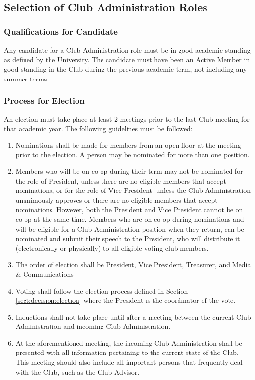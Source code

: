 \documentclass[english,11pt]{article}
\begin{document}
\subsection{Selection of Club Administration Roles} \label{sect:cadmin:selection}

\subsubsection{Qualifications for Candidate} \label{subsect:cadmin:selection:qualifications}
Any candidate for a Club Administration role must be in good academic standing as defined by the University.
The candidate must have been an Active Member in good standing in the Club during the previous academic term, not including any summer terms.

\subsubsection{Process for Election} \label{subsect:cadmin:selection:election}
An election must take place at least 2 meetings prior to the last Club meeting for that academic year. The following guidelines must be followed:

\begin{enumerate}[label=\alph*.]
    \item Nominations shall be made for members from an open floor at the meeting prior to the election.
          A person may be nominated for more than one position.
    \item Members who will be on co-op during their term may not be nominated for the role of President, unless there are no eligible members that accept nominations, or for the role of Vice President, unless the Club Administration unanimously approves or there are no eligible members that accept nominations.
          However, both the President and Vice President cannot be on co-op at the same time.
          Members who are on co-op during nominations and will be eligible for a Club Administration position when they return, can be nominated and submit their speech to the President, who will distribute it (electronically or physically) to all eligible voting club members.
    \item The order of election shall be President, Vice President, Treasurer, and Media \& Communications
    \item Voting shall follow the election process defined in Section \ref{sect:decision:election} where the President is the coordinator of the vote.
    \item Inductions shall not take place until after a meeting between the current Club Administration and incoming Club Administration.
    \item At the aforementioned meeting, the incoming Club Administration shall be presented with all information pertaining to the current state of the Club.
        This meeting should also include all important persons that frequently deal with the Club, such as the Club Advisor.
\end{enumerate}
\end{document}
